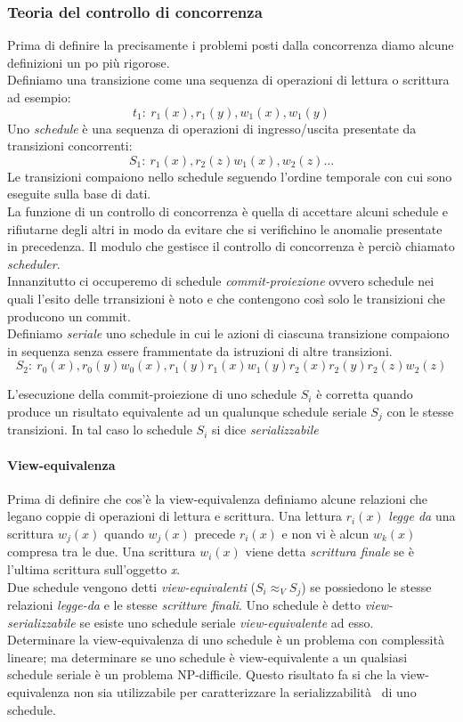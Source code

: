 \subsubsection{Teoria del controllo di concorrenza}
Prima di definire la precisamente i problemi posti dalla concorrenza diamo alcune definizioni un po più rigorose.\\
Definiamo una transizione come una sequenza di operazioni di lettura o scrittura ad esempio:
$$t_1: \ r_1(x),r_1(y),w_1(x),w_1(y)$$
Uno \emph{schedule} è una sequenza di operazioni di ingresso/uscita presentate da transizioni concorrenti:
$$S_1: \ r_1(x),r_2(z)w_1(x),w_2(z) \dots$$
Le transizioni compaiono nello schedule seguendo l'ordine temporale con cui sono eseguite sulla base di dati.\\
La funzione di un controllo di concorrenza è quella di accettare alcuni schedule e rifiutarne degli altri in modo da evitare che si verifichino le anomalie presentate in precedenza.
Il modulo che gestisce il controllo di concorrenza è perciò chiamato \emph{scheduler}.\\
Innanzitutto ci occuperemo di schedule \emph{commit-proiezione} ovvero schedule nei quali l'esito delle trransizioni è noto e che contengono così solo le transizioni che producono un commit.\\
Definiamo \emph{seriale} uno schedule in cui le azioni di ciascuna transizione compaiono in sequenza senza essere frammentate da istruzioni di altre transizioni.
$$S_2: \ r_0(x),r_0(y)w_0(x),r_1(y)r_1(x)w_1(y)r_2(x)r_2(y)r_2(z)w_2(z)$$

L'esecuzione della commit-proiezione di uno schedule $S_i$ è corretta quando produce un risultato equivalente ad un qualunque schedule seriale $S_j$ con le stesse transizioni. In tal caso lo schedule $S_i$ si dice \emph{serializzabile}
\paragraph{View-equivalenza} Prima di definire che cos'è la view-equivalenza definiamo alcune relazioni che legano coppie di operazioni di lettura e scrittura. Una lettura $r_i(x)$ \emph{legge da} una scrittura $w_j(x)$ quando $w_j(x)$ precede $r_i(x)$ e non vi è alcun $w_k(x)$ compresa tra le due.
Una scrittura $w_i(x)$ viene detta \emph{scrittura finale} se è l'ultima scrittura sull'oggetto \emph{x}.\\
Due schedule vengono detti \emph{view-equivalenti} ($S_i \approx_V S_j$) se possiedono le stesse relazioni \emph{legge-da} e le stesse \emph{scritture finali}.
Uno schedule è detto \emph{view-serializzabile} se esiste uno schedule seriale \emph{view-equivalente} ad esso.\\
Determinare la view-equivalenza di uno schedule è un problema con complessità  lineare; ma determinare se uno schedule è view-equivalente a un qualsiasi schedule seriale è un problema NP-difficile. Questo risultato fa si che la view-equivalenza non sia utilizzabile per caratterizzare la serializzabilità  di uno schedule.
